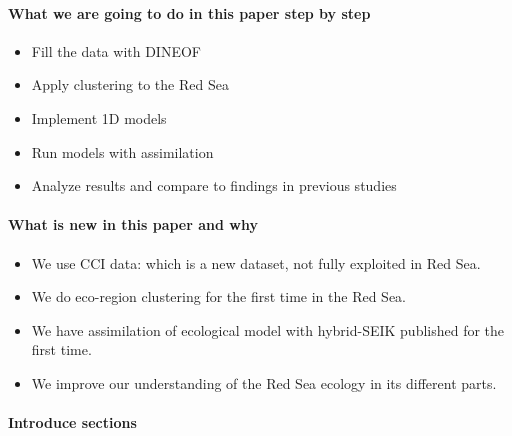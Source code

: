 \paragraph{What we are going to do in this paper step by step}

\begin{itemize}
  \item Fill the data with DINEOF
  \item Apply clustering to the Red Sea
  \item Implement 1D models
  \item Run models with assimilation
  \item Analyze results and compare to findings in previous studies
\end{itemize}

\paragraph{What is new in this paper and why}

\begin{itemize}
  \item We use CCI data: which is a new dataset, not fully exploited in
Red Sea.
  \item We do eco-region clustering for the first time in the Red Sea.
  \item We have assimilation of ecological model with hybrid-SEIK published
for the first time.
  \item We improve our understanding of the Red Sea ecology in its different
parts.
\end{itemize}

\paragraph{Introduce sections}

